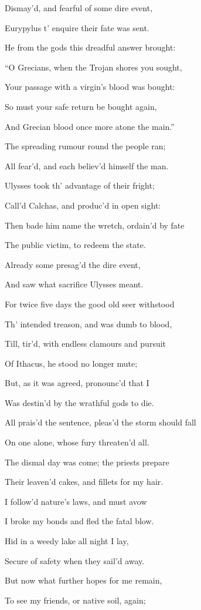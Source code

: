 Dismay’d, and fearful of some dire event,

Eurypylus t’ enquire their fate was sent.

He from the gods this dreadful answer brought:

“O Grecians, when the Trojan shores you sought,

Your passage with a virgin’s blood was bought:

So must your safe return be bought again,

And Grecian blood once more atone the main.”

The spreading rumour round the people ran;

All fear’d, and each believ’d himself the man.

Ulysses took th’ advantage of their fright;

Call’d Calchas, and produc’d in open sight:

Then bade him name the wretch, ordain’d by fate

The public victim, to redeem the state.

Already some presag’d the dire event,

And saw what sacrifice Ulysses meant.

For twice five days the good old seer withstood

Th’ intended treason, and was dumb to blood,

Till, tir’d, with endless clamours and pursuit

Of Ithacus, he stood no longer mute;

But, as it was agreed, pronounc’d that I

Was destin’d by the wrathful gods to die.

All prais’d the sentence, pleas’d the storm should fall

On one alone, whose fury threaten’d all.

The dismal day was come; the priests prepare

Their leaven’d cakes, and fillets for my hair.

I follow’d nature’s laws, and must avow

I broke my bonds and fled the fatal blow.

Hid in a weedy lake all night I lay,

Secure of safety when they sail’d away.

But now what further hopes for me remain,

To see my friends, or native soil, again;

